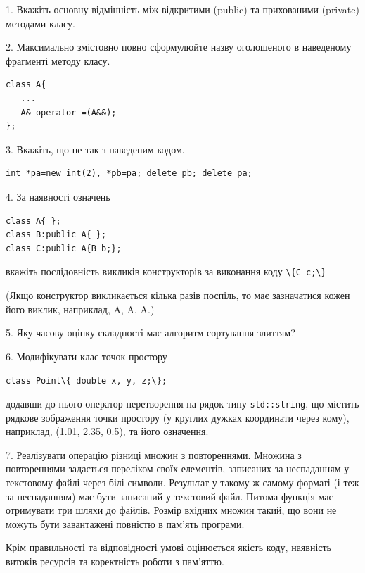 \documentclass[12pt, ukrainian]{article}
\def\code#1{\Verb!#1!}
\begin{document}
{%
1. Вкажіть основну відмінність між відкритими (public) та прихованими (private) методами класу.%
\par
\vspace{2mm}
2. Максимально змістовно повно сформулюйте назву оголошеного в наведеному фрагменті методу класу.
\vspace{-3mm}
\begin{verbatim}class A{
   ...
   A& operator =(A&&);
};\end{verbatim}
\vspace{-3mm}
\par
\vspace{2mm}
3. Вкажіть, що не так з наведеним кодом.
\vspace{-3mm}
\begin{verbatim}int *pa=new int(2), *pb=pa; delete pb; delete pa;\end{verbatim}
\vspace{-3mm}
\par
\vspace{2mm}
4. За наявності означень
\vspace{-3mm}
\begin{verbatim}
class A{ };
class B:public A{ };
class C:public A{B b;};\end{verbatim}
\vspace{-3mm}
вкажіть послідовність викликів конструкторів за виконання коду \code{\{C c;\}} 

(Якщо конструктор викликається кілька разів поспіль, то має зазначатися кожен його виклик, наприклад, A, A, A.)

\vspace{2mm}
5. Яку часову оцінку складності має алгоритм сортування злиттям?
\par
\vspace{2mm}
6. Модифікувати клас точок простору 

\qquad\code{class Point\{ double x, y, z;\};}


додавши до нього оператор перетворення на рядок типу \code{std::string}, що містить рядкове зображення точки простору (у круглих дужках координати через кому), наприклад, (1.01, 2.35, 0.5), та його означення.%
\par
\vspace{2mm}
7. 
Реалізувати операцію різниці множин з повтореннями. Множина з повтореннями задається переліком своїх елементів, записаних за неспаданням у текстовому файлі через білі символи. Результат у такому ж самому форматі (і теж за неспаданням) має бути записаний у текстовий файл. Питома функція має отримувати три шляхи до файлів. Розмір вхідних множин такий, що вони не можуть бути завантажені повністю в пам’ять програми.

Крім правильності та відповідності умові оцінюється якість коду, наявність витоків ресурсів та коректність роботи з пам'яттю. 

}
\end{document}
